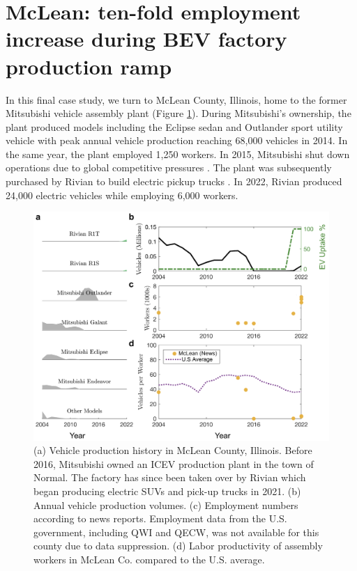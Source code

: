 \documentclass[sn-mathphys,Numbered]{sn-jnl}%
\begin{document}
\section{McLean: ten-fold employment increase during BEV factory production ramp}

In this final case study, we turn to McLean County, Illinois, home to the former Mitsubishi vehicle assembly plant \cite{Motors2004-cc} (Figure \ref{fig:normal}). During Mitsubishi's ownership, the plant produced models including the Eclipse sedan and Outlander sport utility vehicle with peak annual vehicle production reaching 68,000 vehicles in 2014. In the same year, the plant employed 1,250 workers. In 2015, Mitsubishi shut down operations due to global competitive pressures \cite{Yerak2015-kk}. The plant was subsequently purchased by Rivian to build electric pickup trucks \cite{The_Detroit_News2022-ym}. In 2022, Rivian produced 24,000 electric vehicles while employing 6,000 workers. 


\begin{figure}[ht]
\centering
\includegraphics[width=1.0\linewidth]{figures/fig_mclean.png}
\caption{(a) Vehicle production history in McLean County, Illinois. Before 2016, Mitsubishi owned an ICEV production plant in the town of Normal. The factory has since been taken over by Rivian which began producing electric SUVs and pick-up trucks in 2021. (b) Annual vehicle production volumes. (c) Employment numbers according to news reports. Employment data from the U.S. government, including QWI and QECW, was not available for this county due to data suppression. (d) Labor productivity of assembly workers in McLean Co. compared to the U.S. average.}
\label{fig:normal}
\end{figure}
\end{document}
